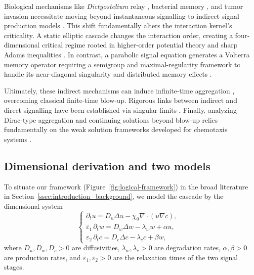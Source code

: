 \documentclass[pdflatex,sn-mathphys-num]{sn-jnl}%
\theoremstyle{thmstyleone}
\theoremstyle{thmstyletwo}
\theoremstyle{thmstylethree}
\begin{document}
Biological mechanisms like \textit{Dictyostelium} relay \cite{garcia2009group,morimoto2024ion,hayashida2026establishing,hirose2025dictyostelium}, bacterial memory \cite{scanlon2025exploring,othmer2013excitation,zhang2023bacterial,tu2013quantitative,gosztolai2020cellular}, and tumor invasion \cite{roussos2011chemotaxis,liu2023angiogenic,wang2023resveratrol} necessitate moving beyond instantaneous signalling to indirect signal production models \cite{tao2017critical,winkler2022family,chen2024negligibility}. This shift fundamentally alters the interaction kernel's criticality. A static elliptic cascade changes the interaction order, creating a four-dimensional critical regime \cite{fujie2017application,fujie2019blowup,yu2026beyond,hosono2025global} rooted in higher-order potential theory and sharp Adams inequalities \cite{adams1988sharp,adams2003sobolev,hebey2000nonlinear,liang2025global,lin1998classification,martinazzi2009classification,ruf2013sharp}. In contrast, a parabolic signal equation generates a Volterra memory operator requiring a semigroup and maximal-regularity framework \cite{pazy2012semigroups,henry1981geometric,jin2025infinite,lunardi2012analytic,wang2026damage,amann1995linear,pruss2016moving,mao2026global,dai2026critical} to handle its near-diagonal singularity and distributed memory effects \cite{xiang2025critical,yang2026critical,laurenccot2024singular,cai2026optimal,mao2025critical,mao2025finite1,shi2021spatial}.

Ultimately, these indirect mechanisms can induce infinite-time aggregation \cite{tao2017critical}, overcoming classical finite-time blow-up. Rigorous links between indirect and direct signalling have been established via singular limits \cite{bui2026parabolic,yu2026microscopic,liu2025global}. Finally, analyzing Dirac-type aggregation \cite{nagai2000chemotactic,wang2025multi,mao2024dirac} and continuing solutions beyond blow-up relies fundamentally on the weak solution frameworks developed for chemotaxis systems \cite{senba2002weak}.

\subsection{Dimensional derivation and two models}
\label{subsec:dimensional-derivation}

To situate our framework (Figure~\ref{fig:logical-framework}) in the broad literature in Section~\ref{ssec:introduction_background}, we model the cascade by the dimensional system
\begin{equation}
\label{eq:dimensional-cascade}
\begin{cases}
    \partial_t u = D_u\Delta u-\chi_0\nabla\cdot(u\nabla c),\\[2pt]
    \varepsilon_1\,\partial_t w = D_w\Delta w-\lambda_w w+\alpha u,\\[2pt]
    \varepsilon_2\,\partial_t c = D_c\Delta c-\lambda_c c+\beta w,
\end{cases}
\end{equation}
where \(D_u,D_w,D_c>0\) are diffusivities, \(\lambda_w,\lambda_c>0\) are
degradation rates, \(\alpha,\beta>0\) are production rates, and
\(\varepsilon_1,\varepsilon_2>0\) are the relaxation times of the two signal
stages. 
\end{document}
